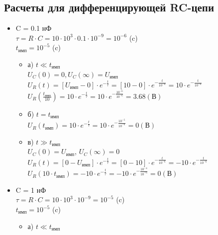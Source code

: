 \subsection{Расчеты для дифференцирующей RC-цепи}
\begin{itemize}
\item C = 0.1 нФ\\

		$\tau = R \cdot C = 10 \cdot 10^3 \cdot 0.1 \cdot 10^{-9} = 10^{-6}$ (c)\\
		$t_\text{имп} = 10^{-5}$ (c)
		
\begin{itemize}
\item[] а) $t \ll t_\text{имп}$\\
		$U_C(0)	= 0, U_C(\infty) = U_\text{имп}$\\
		$U_R(t) = [U_\text{имп} - 0] \cdot e^{-\frac{t}{\tau}} = [10 - 0] \cdot e^{-\frac{t}{10^{-6}}} = 10 \cdot e^{-\frac{t}{10^{-6}}}$\\
		$U_R(\frac{t_\text{имп}}{10}) = 10 \cdot e^{-\frac{t}{\tau}} = 10 \cdot e^{-\frac{10^{-6}}{10^{-6}}} = 3.68 (\text{В})$\\

\item[] б) $t = t_\text{имп}$\\
		$U_R(t_\text{имп}) = 10 \cdot e^{-\frac{t}{\tau}} = 10 \cdot e^{-\frac{10^{-5}}{10^{-6}}} = 0 (\text{В})$\\
	
\item[] в) $t \gg t_\text{имп}$\\
		
		$U_C(0)	= U_\text{имп}$, $U_C(\infty) = 0$\\		
		$U_R(t) = [0 - U_\text{имп}] \cdot e^{-\frac{t}{\tau}} = [0 - 10] \cdot e^{-\frac{t}{10^{-6}}} = -10 \cdot e^{-\frac{t}{10^{-6}}}$\\
		$U_R(10 \cdot t_\text{имп}) = -10 \cdot e^{-\frac{t}{\tau}} = -10 \cdot e^{-\frac{10^{-4}}{10^{-6}}} = 0 (\text{В})$\\

\end{itemize}

\item C = 1 нФ\\

		$\tau = R \cdot C = 10 \cdot 10^3 \cdot 10^{-9} = 10^{-5}$ (c)\\
		$t_\text{имп} = 10^{-5}$ (c)

\begin{itemize}
\item[] а) $t \ll t_\text{имп}$\\


\end{itemize}
\end{itemize}
